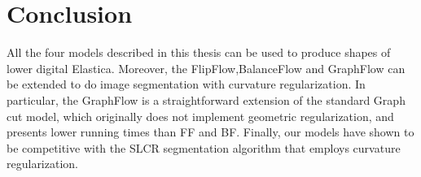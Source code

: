 


\section{Conclusion}

All the four models described in this thesis can be used to produce shapes of lower digital Elastica. Moreover, the FlipFlow,BalanceFlow and GraphFlow can be extended to do image segmentation with curvature regularization. In particular, the GraphFlow is a straightforward extension of the standard Graph cut model, which originally does not implement geometric regularization, and presents lower running times than FF and BF. Finally, our models have shown to be competitive with the SLCR segmentation algorithm that employs curvature regularization.




